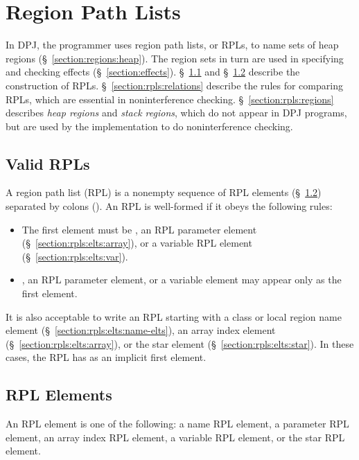 \section{Region Path Lists}
\label{section:rpls}

In DPJ, the programmer uses region path lists, or RPLs, to name sets
of heap regions (\S~\ref{section:regions:heap}).  The region sets in
turn are used in specifying and checking effects
(\S~\ref{section:effects}).  \S~\ref{section:rpls:valid} and
\S~\ref{section:rpls:elts} describe the construction of RPLs.
\S~\ref{section:rpls:relations} describe the rules for comparing RPLs,
which are essential in noninterference checking.
\S~\ref{section:rpls:regions} describes \emph{heap regions} and
\emph{stack regions}, which do not appear in DPJ programs, but are
used by the implementation to do noninterference checking.

\subsection{Valid RPLs}
\label{section:rpls:valid}

A region path list (RPL) is a nonempty sequence of RPL elements
(\S~\ref{section:rpls:elts}) separated by colons (\kwd{:}).  An RPL
is well-formed if it obeys the following rules:
%
\begin{itemize}
%
\item The first element must be , an RPL parameter element
  (\S~\ref{section:rpls:elts:array}), or a variable RPL element
  (\S~\ref{section:rpls:elts:var}).
%
\item {}, an RPL parameter element, or a variable element may
  appear only as the first element.
%
\end{itemize}
%
It is also acceptable to write an RPL starting with a class or local
region name element (\S~\ref{section:rpls:elts:name-elts}), an array
index element (\S~\ref{section:rpls:elts:array}), or the star element
(\S~\ref{section:rpls:elts:star}).  In these cases, the RPL has
 as an implicit first element.


\subsection{RPL Elements}
\label{section:rpls:elts}

An RPL element is one of the following: a name RPL element, a
parameter RPL element, an array index RPL element, a variable RPL
element, or the star RPL element.
%

